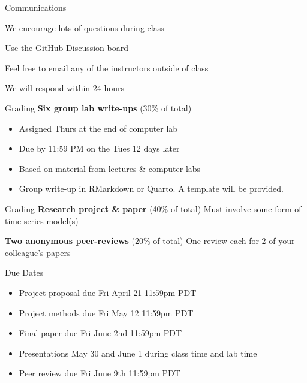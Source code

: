 \documentclass[
  ignorenonframetext,
]{beamer}
\providecommand{\tightlist}{%
  \setlength{\itemsep}{0pt}\setlength{\parskip}{0pt}}
\begin{document}
\begin{frame}{Communications}
\label{communications}
\begin{block}{We encourage lots of questions during class}
\label{we-encourage-lots-of-questions-during-class}
\end{block}

\begin{block}{Use the GitHub
\href{https://github.com/atsa-es/fish550-2025/discussions}{Discussion
board}}
\label{use-the-github-discussion-board}
\end{block}

\begin{block}{Feel free to email any of the instructors outside of
class}
\label{feel-free-to-email-any-of-the-instructors-outside-of-class}
\end{block}

\begin{block}{We will respond within 24 hours}
\label{we-will-respond-within-24-hours}
\end{block}
\end{frame}

\begin{frame}{Grading}
\label{grading}
\textbf{Six group lab write-ups} (30\% of total)

\begin{itemize}
\item
  Assigned Thurs at the end of computer lab
\item
  Due by 11:59 PM on the Tues 12 days later
\item
  Based on material from lectures \& computer labs
\item
  Group write-up in RMarkdown or Quarto. A template will be provided.
\end{itemize}
\end{frame}

\begin{frame}{Grading}
\label{grading-1}
\textbf{Research project \& paper} (40\% of total) Must involve some
form of time series model(s)

\textbf{Two anonymous peer-reviews} (20\% of total) One review each for
2 of your colleague's papers

\begin{block}{Due Dates}
\label{due-dates}
\begin{itemize}
\tightlist
\item
  Project proposal due Fri April 21 11:59pm PDT
\item
  Project methods due Fri May 12 11:59pm PDT
\item
  Final paper due Fri June 2nd 11:59pm PDT
\item
  Presentations May 30 and June 1 during class time and lab time
\item
  Peer review due Fri June 9th 11:59pm PDT
\end{itemize}
\end{block}
\end{frame}
\end{document}
